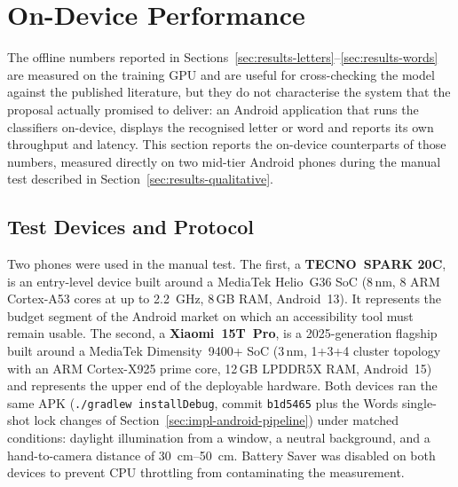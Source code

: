 \section{On-Device Performance}
\label{sec:results-on-device}

The offline numbers reported in
Sections~\ref{sec:results-letters}--\ref{sec:results-words} are measured
on the training GPU and are useful for cross-checking the model against
the published literature, but they do not characterise the system that
the proposal actually promised to deliver: an Android application that
runs the classifiers on-device, displays the recognised letter or word
and reports its own throughput and latency. This section reports the
on-device counterparts of those numbers, measured directly on two
mid-tier Android phones during the manual test described in
Section~\ref{sec:results-qualitative}.

\subsection{Test Devices and Protocol}
\label{sec:results-on-device-protocol}

Two phones were used in the manual test. The first, a
\textbf{TECNO~SPARK 20C}, is an entry-level device built around a
MediaTek Helio~G36 SoC (8\,nm, 8 ARM Cortex-A53 cores at up to
\SI{2.2}{\giga\hertz}, 8\,GB RAM, Android~13). It represents the
budget segment of the Android market on which an accessibility tool
must remain usable. The second, a \textbf{Xiaomi~15T~Pro}, is a
2025-generation flagship built around a MediaTek Dimensity~9400+ SoC
(3\,nm, 1+3+4 cluster topology with an ARM Cortex-X925 prime core,
12\,GB LPDDR5X RAM, Android~15) and represents the upper end of the
deployable hardware. Both devices ran the same APK
(\texttt{./gradlew installDebug}, commit \texttt{b1d5465} plus the
Words single-shot lock changes of Section~\ref{sec:impl-android-pipeline})
under matched conditions: daylight illumination from a window, a
neutral background, and a hand-to-camera distance of
\SIrange{30}{50}{\centi\metre}. Battery Saver was disabled on both
devices to prevent CPU throttling from contaminating the measurement.

